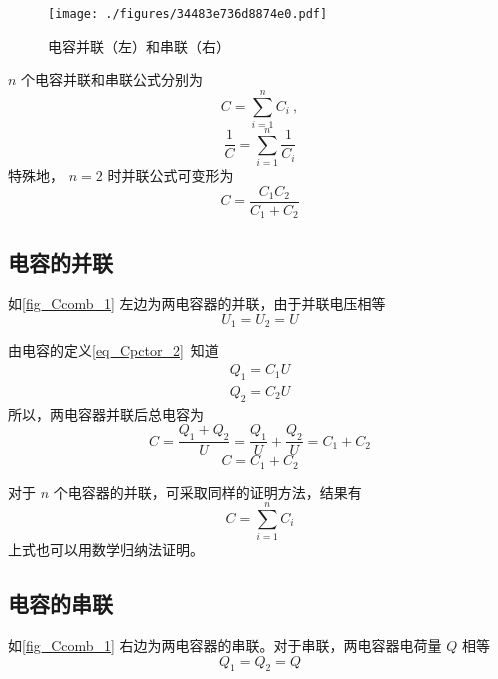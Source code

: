 

\begin{figure}[ht]
\centering
\texttt{[image: ./figures/34483e736d8874e0.pdf]}
\caption{电容并联（左）和串联（右）} \label{fig_Ccomb_1}
\end{figure}

$n$ 个电容并联和串联公式分别为
\begin{equation}
C=\sum_{i=1}^{n}C_i~,
\end{equation}
\begin{equation}
\frac{1}{C}=\sum_{i=1}^{n}\frac{1}{C_i}
\end{equation}
特殊地， $n = 2$ 时并联公式可变形为
\begin{equation}
C = \frac{C_1 C_2}{C_1 + C_2}
\end{equation}


\subsection{电容的并联}
如\autoref{fig_Ccomb_1} 左边为两电容器的并联，由于并联电压相等
\begin{equation}
U_1=U_2=U
\end{equation}

由电容的定义\autoref{eq_Cpctor_2}~知道
\begin{equation}
\begin{aligned}
Q_1=C_1U\\
Q_2=C_2U
\end{aligned}
\end{equation}
所以，两电容器并联后总电容为
\begin{equation}
C=\frac{Q_1+Q_2}{U}=\frac{Q_1}{U}+\frac{Q_2}{U}=C_1+C_2
\end{equation}
\begin{equation}
C = C_1 + C_2
\end{equation}

对于 $n$ 个电容器的并联，可采取同样的证明方法，结果有
\begin{equation}
C=\sum_{i=1}^{n}C_i
\end{equation}
上式也可以用数学归纳法证明。

\subsection{电容的串联}
如\autoref{fig_Ccomb_1} 右边为两电容器的串联。对于串联，两电容器电荷量 $Q$ 相等
\begin{equation}
Q_1=Q_2=Q
\end{equation}

